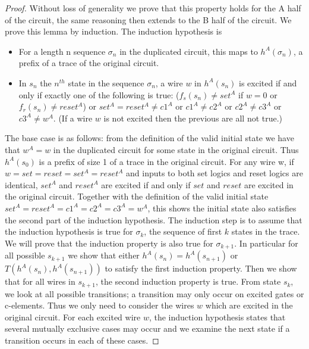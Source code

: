 \documentclass{article}
\begin{document}
\begin{proof}
Without loss of generality we prove that this property holds for the A half of the circuit, the same reasoning then extends to the B half of the circuit.  We prove this lemma by induction.  The induction hypothesis is
\begin{itemize}
\item For a length n sequence $\sigma_n$ in the duplicated circuit, this maps to $h^{A}(\sigma_n)$, a prefix of a trace of the original circuit. 
\item In $s_n$ the $n^{th}$ state in the sequence $\sigma_n$, a wire $w$ in $h^A(s_n)$ is excited if and only if exactly one of the following is true: ($f_s(s_n)\neq set^A$ if $w=0$ or $f_r(s_n)\neq reset^A$) or $set^A=reset^A \neq c1^A$ or $c1^{A}\neq c2^{A}$ or $c2^{A}\neq c3^{A}$ or $c3^{A} \neq w^A$. (If a wire $w$ is not excited then the previous are all not true.)  
\end{itemize}
The base case is as follows: from the definition of the valid initial state we have that $w^A=w$ in the duplicated circuit for some state in the original circuit.  Thus $h^A(s_0)$ is a prefix of size 1 of a trace in the original circuit.  For any wire w, if $w=set=reset=set^A=reset^A$ and inputs to both set logics and reset logics are identical, $set^A$ and $reset^A$ are excited if and only if $set$ and $reset$ are excited in the original circuit.  Together with the definition of the valid initial state $set^A=reset^A=c1^A=c2^A=c3^A=w^A$, this shows the initial state also satisfies the second part of the induction hypothesis.   \newline
The induction step is to assume that the induction hypothesis is true for $\sigma_k$, the sequence of first $k$ states in the trace.  We will prove that the induction property is also true for $\sigma_{k+1}$.  In particular for all possible $s_{k+1}$ we show that either $h^A(s_{n})=h^A(s_{n+1})$ or $T(h^A(s_{n}),h^A(s_{n+1}))$ to satisfy the first induction property.  Then we show that for all wires in $s_{k+1}$, the second induction property is true.\newline
From state $s_k$, we look at all possible transitions; a transition may only occur on excited gates or c-elements.  Thus we only need to consider the wires $w$ which are excited in the original circuit.  For each excited wire $w$, the induction hypothesis states that several mutually exclusive cases may occur and we examine the next state if a transition occurs in each of these cases.

\end{proof}
\end{document}
